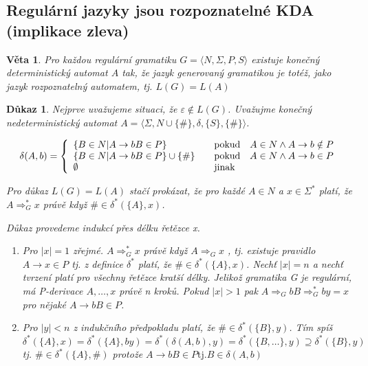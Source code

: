 \documentclass[10pt, a4paper, titlepage]{article}
\theoremstyle{note}
\newtheorem{dukaz}{Důkaz}
\newtheorem{veta}{Věta}
\begin{document}
\subsection{Regulární jazyky jsou rozpoznatelné KDA (implikace zleva)}

\begin{veta}
Pro každou regulární gramatiku $G=\langle N,\Sigma,P,S \rangle$ existuje konečný deterministický automat $A$ tak, že jazyk generovaný gramatikou je totéž, jako jazyk rozpoznatelný automatem, tj. $L(G)=L(A)$
\end{veta} 

\begin{dukaz}
Nejprve uvažujeme situaci, že $\varepsilon \notin L(G)$. Uvažujme konečný nedeterministický automat $A = \langle \Sigma, N \cup \lbrace \# \rbrace, \delta, \lbrace S \rbrace,\lbrace \# \rbrace \rangle$.

$$
\delta(A,b)=\left\{
\begin{array}{l@{\quad\mbox{}\quad}l}
\lbrace B \in N | A \rightarrow bB \in P \rbrace & \text{pokud}\quad A \in N \wedge A \rightarrow b \notin P\\
\lbrace B \in N | A \rightarrow bB \in P \rbrace \cup \lbrace \# \rbrace & \text{pokud}\quad A \in N \wedge A \rightarrow b \in P\\
\emptyset & \text{jinak}\\
\end{array}
\right.
$$

Pro důkaz $L(G)=L(A)$ stačí prokázat, že pro každé $A \in N $  a $ x \in \Sigma^* $ platí, že $A \Rightarrow_G^* x$ právě když $ \# \in \delta^* (\lbrace A \rbrace,x)$.

Důkaz provedeme indukcí přes délku řetězce x. 
\begin{enumerate}
\item
Pro $|x|=1$ zřejmé. $A \Rightarrow_G^* x $ právě když $A \Rightarrow_G x $ , tj. existuje pravidlo $A \rightarrow x \in P$ tj. z definice $\delta^*$ platí, že $ \#\in \delta^* (\lbrace A \rbrace, x) $.
Nechť $|x|=n$ a nechť tvrzení platí pro všechny řetězce kratší délky. Jelikož gramatika G je regulární, má P-derivace $A,\ldots,x$ právě n kroků. Pokud $|x|>1$ pak $ A \Rightarrow_G bB \Rightarrow_G^* by = x $ pro nějaké $ A \rightarrow bB \in P$.

\item
Pro $|y|<n$ z indukčního předpokladu platí, že $\#\in \delta^* (\lbrace B \rbrace,y)$.
Tím spíš $\delta^* ( \lbrace A \rbrace, x ) = \delta^* ( \lbrace A \rbrace, by ) = \delta^* ( \delta( A , b ),y) = \delta^* ( \lbrace B,\ldots \rbrace, y ) \supseteq \delta^* ( \lbrace B \rbrace, y )$ tj. $ \# \in \delta^* (\lbrace A \rbrace,\#)$ protože $A \rightarrow bB \in P \text{tj.} B\in\delta (A,b)$


\end{enumerate}
\end{dukaz}
\end{document}
